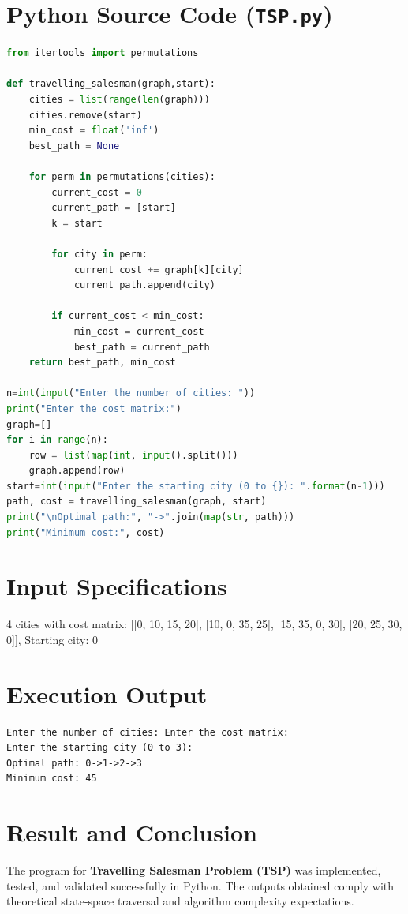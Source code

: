 \documentclass[11pt,a4paper]{report}
\begin{document}
\section{Python Source Code (\texttt{TSP.py})}
\begin{lstlisting}[language=Python]
from itertools import permutations

def travelling_salesman(graph,start):
    cities = list(range(len(graph)))
    cities.remove(start)
    min_cost = float('inf')
    best_path = None

    for perm in permutations(cities):
        current_cost = 0
        current_path = [start] 
        k = start

        for city in perm:
            current_cost += graph[k][city]
            current_path.append(city)

        if current_cost < min_cost:
            min_cost = current_cost
            best_path = current_path
    return best_path, min_cost

n=int(input("Enter the number of cities: "))
print("Enter the cost matrix:")
graph=[]
for i in range(n):
    row = list(map(int, input().split()))
    graph.append(row)
start=int(input("Enter the starting city (0 to {}): ".format(n-1)))
path, cost = travelling_salesman(graph, start)
print("\nOptimal path:", "->".join(map(str, path))) 
print("Minimum cost:", cost)
\end{lstlisting}

\section{Input Specifications}
4 cities with cost matrix: [[0, 10, 15, 20], [10, 0, 35, 25], [15, 35, 0, 30], [20, 25, 30, 0]], Starting city: 0

\section{Execution Output}
\begin{tcolorbox}[colback=outputback,colframe=outputframe,title={\textbf{Terminal Output - Travelling Salesman Problem (TSP)}}]
\begin{verbatim}
Enter the number of cities: Enter the cost matrix:
Enter the starting city (0 to 3): 
Optimal path: 0->1->2->3
Minimum cost: 45
\end{verbatim}
\end{tcolorbox}

\section{Result and Conclusion}
The program for \textbf{Travelling Salesman Problem (TSP)} was implemented, tested, and validated successfully in Python. The outputs obtained comply with theoretical state-space traversal and algorithm complexity expectations.
\end{document}
